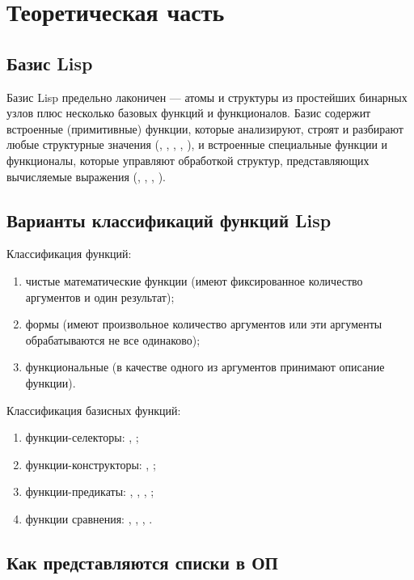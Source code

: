 \documentclass[a4paper,oneside,12pt]{extreport}
\begin{document}
\section*{Теоретическая часть}

\subsection*{Базис Lisp}

Базис Lisp предельно лаконичен — атомы и структуры из простейших бинарных узлов плюс несколько базовых функций и функционалов.
Базис содержит встроенные (примитивные) функции, которые анализируют, строят и разбирают любые структурные значения (, , , , ), и встроенные специальные функции и функционалы, которые управляют обработкой структур, представляющих вычисляемые выражения (, , , ).

\subsection*{Варианты классификаций функций Lisp}

Классификация функций:
\begin{enumerate}
	\item чистые математические функции (имеют фиксированное количество аргументов и один результат);
	\item формы (имеют произвольное количество аргументов или эти аргументы обрабатываются не все одинаково);
	\item функциональные (в качестве одного из аргументов принимают описание функции).
\end{enumerate}

Классификация базисных функций:
\begin{enumerate}
	\item функции-селекторы: , ;
	\item функции-конструкторы: , ;
	\item функции-предикаты: , , , ;
	\item функции сравнения: , , , .
\end{enumerate}

\subsection*{Как представляются списки в ОП}
\end{document}
